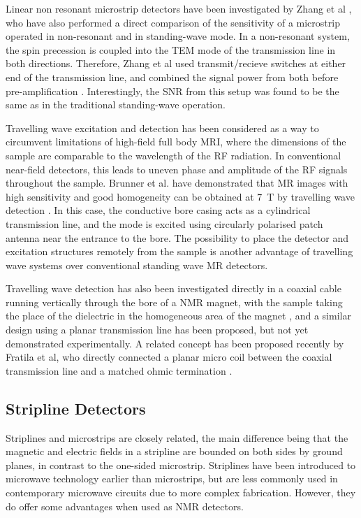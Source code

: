 Linear non resonant microstrip detectors have been investigated by Zhang
et al \cite{Zhang:2008uh}, who have also performed a direct comparison of
the sensitivity of a microstrip operated in non-resonant and in
standing-wave mode. In a non-resonant system, the spin precession is
coupled into the TEM mode of the transmission line in both directions.
Therefore, Zhang et al used transmit/recieve switches at either end of
the transmission line, and combined the signal power from both before
pre-amplification \cite{Zhang:2009tu}. Interestingly, the SNR from this
setup was found to be the same as in the traditional standing-wave
operation. 

Travelling wave excitation and detection has been considered
as a way to circumvent limitations of high-field full body MRI, where
the dimensions of the sample are comparable to the wavelength of the RF
radiation. In conventional near-field detectors, this leads to uneven
phase and amplitude of the RF signals throughout the sample. Brunner et
al. have demonstrated that MR images with high sensitivity and good
homogeneity can be obtained at 7~T by travelling wave detection
\cite{Brunner:2009ff}. In this case, the conductive bore casing acts as a
cylindrical transmission line, and the  mode is excited using
circularly polarised patch antenna near the entrance to the bore. The
possibility to place the detector and excitation structures remotely
from the sample is another advantage of travelling wave systems over
conventional standing wave MR detectors.

 Travelling wave detection has
also been investigated directly in a coaxial cable running vertically
through the bore of a NMR magnet, with the sample taking the place of
the dielectric in the homogeneous area of the magnet \cite{Tang:2011ev},
and a similar design using a planar transmission line has been proposed,
but not yet demonstrated experimentally. A related concept has been
proposed recently by Fratila et al, who directly connected a planar
micro coil between the coaxial transmission line and a matched ohmic
termination \cite{Fratila:2014bv}.

\subsection{Stripline Detectors}
Striplines and microstrips are closely related, 
the main difference being that the
magnetic and electric fields in a stripline are bounded on both sides by
ground planes, in contrast to the one-sided microstrip. Striplines have
been introduced to microwave technology earlier than microstrips, but
are less commonly used in contemporary microwave circuits due to more
complex fabrication. However, they do offer some advantages when used as
NMR detectors. 

